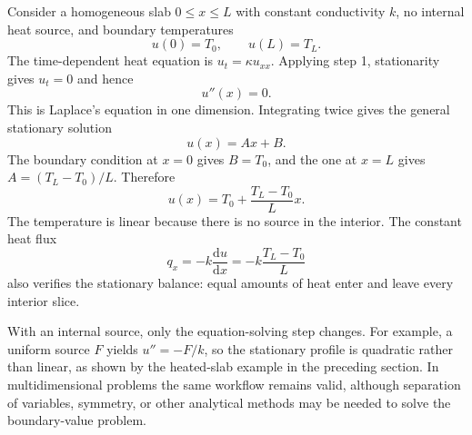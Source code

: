 \begin{example}
Consider a homogeneous slab $0\leq x\leq L$ with constant conductivity $k$, no internal heat source, and boundary temperatures
\begin{equation}
u(0)=T_0,\qquad u(L)=T_L.
\end{equation}
The time-dependent heat equation is $u_t=\kappa u_{xx}$. Applying step 1, stationarity gives $u_t=0$ and hence
\begin{equation}
u''(x)=0.
\end{equation}
This is Laplace's equation in one dimension. Integrating twice gives the general stationary solution
\begin{equation}
u(x)=A x+B.
\end{equation}
The boundary condition at $x=0$ gives $B=T_0$, and the one at $x=L$ gives $A=(T_L-T_0)/L$. Therefore
\begin{equation}
\boxed{u(x)=T_0+\frac{T_L-T_0}{L}x.}
\end{equation}
The temperature is linear because there is no source in the interior. The constant heat flux
\begin{equation}
q_x=-k\frac{\mathrm du}{\mathrm dx}
=-k\frac{T_L-T_0}{L}
\end{equation}
also verifies the stationary balance: equal amounts of heat enter and leave every interior slice.
\end{example}

With an internal source, only the equation-solving step changes. For example, a uniform source $F$ yields $u''=-F/k$, so the stationary profile is quadratic rather than linear, as shown by the heated-slab example in the preceding section. In multidimensional problems the same workflow remains valid, although separation of variables, symmetry, or other analytical methods may be needed to solve the boundary-value problem.